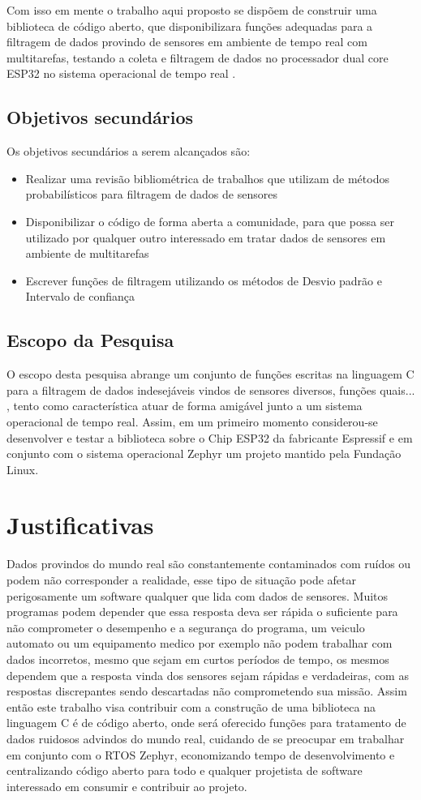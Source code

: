 Com isso em mente o trabalho aqui proposto se dispõem de construir uma biblioteca de código aberto, que disponibilizara funções adequadas para a filtragem de dados provindo de sensores em ambiente de tempo real com multitarefas, testando a coleta e filtragem de dados no processador dual core ESP32 no sistema operacional de tempo real \cite{Zephyr}.

\subsection{Objetivos secundários}
Os objetivos secundários a serem alcançados são:
\begin{itemize}
\item Realizar uma revisão bibliométrica de trabalhos que utilizam de métodos probabilísticos para filtragem de dados de sensores
\item Disponibilizar o código de forma aberta a comunidade, para que possa ser utilizado por qualquer outro interessado em tratar dados de sensores em ambiente de multitarefas
\item Escrever funções de filtragem utilizando os métodos de Desvio padrão e Intervalo de confiança
\end{itemize}


\subsection{Escopo da Pesquisa}
O escopo desta pesquisa abrange um conjunto de funções escritas na linguagem C para a filtragem de dados indesejáveis vindos de sensores diversos, funções quais... %
, tento como característica atuar de forma amigável junto a um sistema operacional de tempo real. Assim, em um primeiro momento considerou-se desenvolver e testar a biblioteca sobre o Chip ESP32 da fabricante Espressif e em conjunto com o sistema operacional Zephyr um projeto mantido pela Fundação Linux.  


\section{Justificativas}
Dados provindos do mundo real são constantemente contaminados com ruídos ou podem não corresponder a realidade, esse tipo de situação pode afetar perigosamente um software qualquer que lida com dados de sensores. Muitos programas podem depender que essa resposta deva ser rápida o suficiente para não comprometer o desempenho e a segurança do programa, um veiculo automato ou um equipamento medico por exemplo não podem trabalhar com dados incorretos, mesmo que sejam em curtos períodos de tempo, os mesmos dependem que a resposta vinda dos sensores sejam rápidas e verdadeiras, com as respostas discrepantes sendo descartadas não comprometendo sua missão. 
Assim então este trabalho visa contribuir com a construção de uma biblioteca na linguagem C é de código aberto, onde será oferecido funções para tratamento de dados ruidosos advindos do mundo real, cuidando de se preocupar em trabalhar em conjunto com o RTOS Zephyr, economizando tempo de desenvolvimento e centralizando código aberto para todo e qualquer projetista de software interessado em consumir e contribuir ao projeto.


